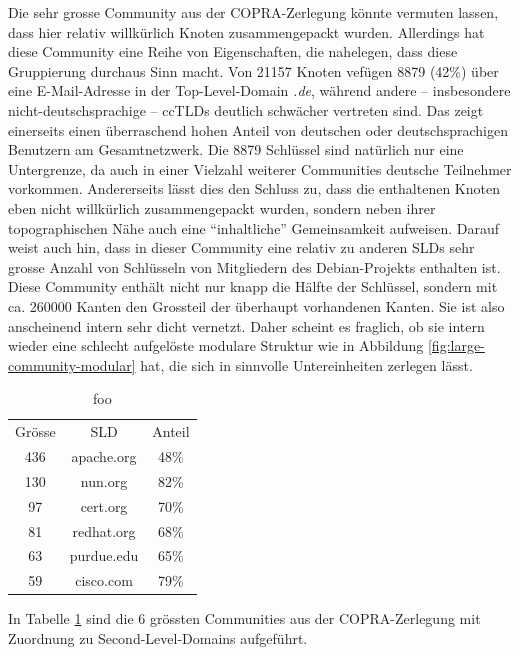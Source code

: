 Die sehr grosse Community aus der COPRA-Zerlegung k\"onnte vermuten
lassen, dass hier relativ willk\"urlich Knoten zusammengepackt
wurden. Allerdings hat diese Community eine Reihe von Eigenschaften,
die nahelegen, dass diese Gruppierung durchaus Sinn macht. Von 21157
Knoten vef\"ugen 8879 (42\%) \"uber eine E-Mail-Adresse in der
Top-Level-Domain \emph{.de}, w\"ahrend andere -- insbesondere
nicht-deutschsprachige -- ccTLDs deutlich schw\"acher vertreten
sind. Das zeigt einerseits einen \"uberraschend hohen Anteil von
deutschen oder deutschsprachigen Benutzern am Gesamtnetzwerk. Die 8879
Schl\"ussel sind nat\"urlich nur eine Untergrenze, da auch in einer
Vielzahl weiterer Communities deutsche Teilnehmer
vorkommen. Andererseits l\"asst dies den Schluss zu, dass die
enthaltenen Knoten eben nicht willk\"urlich zusammengepackt wurden,
sondern neben ihrer topographischen N\"ahe auch eine ``inhaltliche''
Gemeinsamkeit aufweisen. Darauf weist auch hin, dass in dieser
Community eine relativ zu anderen SLDs sehr grosse Anzahl von
Schl\"usseln von Mitgliedern des Debian-Projekts enthalten ist. Diese
Community enth\"alt nicht nur knapp die H\"alfte der Schl\"ussel,
sondern mit ca. 260000 Kanten den Grossteil der \"uberhaupt
vorhandenen Kanten. Sie ist also anscheinend intern sehr dicht
vernetzt. Daher scheint es fraglich, ob sie intern wieder eine
schlecht aufgel\"oste modulare Struktur wie in Abbildung
\ref{fig:large-community-modular} hat, die sich in sinnvolle
Untereinheiten zerlegen l\"asst.

\begin{table}
  \centering
  \begin{tabular}{c|c|c}
    Gr\"osse & SLD & Anteil \\
    436 & apache.org & 48\% \\
    130 & nun.org & 82\% \\
    97 & cert.org & 70\% \\
    81 & redhat.org & 68\% \\
    63 & purdue.edu & 65\% \\
    59 & cisco.com & 79\% 
  \end{tabular}
  \caption{foo}
  \label{tab:ass-examples}
\end{table}
In Tabelle \ref{tab:ass-examples} sind die 6 gr\"ossten Communities
aus der COPRA-Zerlegung mit Zuordnung zu Second-Level-Domains
aufgef\"uhrt.


